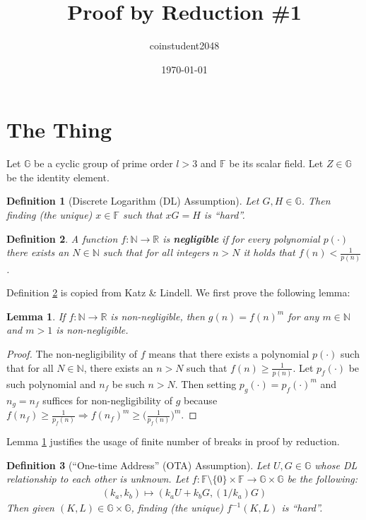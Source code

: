 \documentclass{article}
\title{Proof by Reduction \#1}
\author{coinstudent2048}
\date{\today}
\newtheorem{definition}{Definition}[section]
\newtheorem{lemma}[theorem]{Lemma}
\begin{document}
\maketitle


\section{The Thing}
\noindent Let $\mathbb{G}$ be a cyclic group of prime order $l>3$ and $\mathbb{F}$ be its scalar field. Let $Z\in\mathbb{G}$ be the identity element.

\begin{definition}[Discrete Logarithm (DL) Assumption]
Let $G, H\in\mathbb{G}$. Then finding (the unique) $x\in\mathbb{F}$ such that $xG=H$ is ``hard''.
\end{definition}

\begin{definition}\label{negl}
A function $f:\mathbb{N}\rightarrow\mathbb{R}$ is \textbf{\em negligible} if for every polynomial $p(\cdot)$ there exists an $N\in\mathbb{N}$ such that for all integers $n>N$ it holds that $f(n)<\frac{1}{p(n)}$.
\end{definition}

\noindent Definition \ref{negl} is copied from Katz \& Lindell. We first prove the following lemma:

\begin{lemma}\label{negl-exp}
If $f:\mathbb{N}\rightarrow\mathbb{R}$ is non-negligible, then $g(n)=f(n)^m$ for any $m\in\mathbb{N}$ and $m>1$ is non-negligible.
\end{lemma}
\begin{proof}
The non-negligibility of $f$ means that there exists a polynomial $p(\cdot)$ such that for all $N\in\mathbb{N}$, there exists an $n>N$ such that $f(n)\ge\frac{1}{p(n)}$. Let $p_f(\cdot)$ be such polynomial and $n_f$ be such $n>N$. Then setting $p_g(\cdot)=p_f(\cdot)^m$ and $n_g=n_f$ suffices for non-negligibility of $g$ because $f(n_f)\ge\frac{1}{p_f(n)}\Rightarrow f(n_f)^m\ge\big(\frac{1}{p_f(n)}\big)^m$.
\end{proof}

\noindent Lemma \ref{negl-exp} justifies the usage of finite number of breaks in proof by reduction.

\begin{definition}[``One-time Address'' (OTA) Assumption]
Let $U, G\in\mathbb{G}$ whose DL relationship to each other is unknown. Let $f:\mathbb{F}\setminus\{0\}\times\mathbb{F}\rightarrow\mathbb{G}\times\mathbb{G}$ be the following:
\begin{align*}
    (k_a, k_b) \mapsto (k_a U + k_b G, (1/k_a)G)
\end{align*}
Then given $(K, L)\in\mathbb{G}\times\mathbb{G}$, finding (the unique) $f^{-1}(K,L)$ is ``hard''.
\end{definition}
\end{document}
